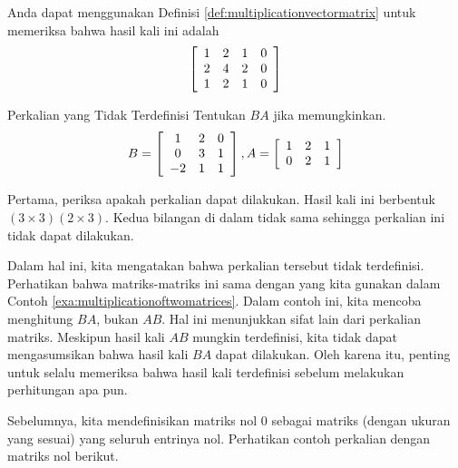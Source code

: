 \begin{solution}
Anda dapat menggunakan Definisi \ref{def:multiplicationvectormatrix} untuk memeriksa bahwa hasil kali ini adalah
\begin{equation*}
\left[
\begin{array}{cccc}
1 & 2 & 1 & 0 \\
2 & 4 & 2 & 0 \\
1 & 2 & 1 & 0
\end{array}
\right]
\end{equation*}
\end{solution}

\begin{example}{Perkalian yang Tidak Terdefinisi}\label{exa:undefinedmatrixmultiplication}
Tentukan $BA$ jika memungkinkan.
\begin{equation*}
B = \left[
\begin{array}{ccc}
1 & 2 & 0 \\
0 & 3 & 1 \\
-2 & 1 & 1
\end{array}
\right],  A = \left[
\begin{array}{ccc}
1 & 2 & 1 \\
0 & 2 & 1
\end{array}
\right]
\end{equation*}
\end{example}

\begin{solution} Pertama, periksa apakah perkalian dapat dilakukan. Hasil kali ini berbentuk $\left( 3\times 3\right)
\left( 2\times 3\right) .$ Kedua bilangan di dalam tidak sama sehingga perkalian ini tidak dapat
dilakukan. 
\end{solution}

Dalam hal ini, kita mengatakan bahwa perkalian tersebut tidak terdefinisi.
Perhatikan bahwa matriks-matriks ini sama dengan yang kita gunakan dalam Contoh \ref{exa:multiplicationoftwomatrices}.
Dalam contoh ini, kita mencoba menghitung $BA$, bukan $AB$. Hal ini menunjukkan sifat lain
dari perkalian matriks. Meskipun hasil kali $AB$ mungkin terdefinisi, kita tidak dapat mengasumsikan bahwa
hasil kali $BA$ dapat dilakukan. Oleh karena itu, penting untuk selalu memeriksa bahwa hasil kali terdefinisi
sebelum melakukan perhitungan apa pun.

Sebelumnya, kita mendefinisikan matriks nol $0$ sebagai matriks (dengan
ukuran yang sesuai) yang seluruh entrinya nol. Perhatikan
contoh perkalian dengan matriks nol berikut.

